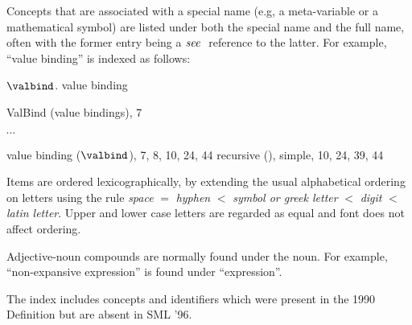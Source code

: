 \begin{theindex}
Concepts
 that are associated with a
special name (e.g, a meta-variable or a mathematical symbol)
are listed under both the special name and the full name,
often with the former entry being a ${\it see\ }$ reference to the latter.
For example, ``value binding'' is indexed as follows:
\indexspace

\item $\valbind$. \see value binding
\item ValBind (value bindings), 7
\item $\cdots$
\item value binding ($\valbind$), 7, 8, 10, 24, 44
\subitem recursive (), \recrefs
\subitem simple, 10, 24, 39, 44
\indexspace

Items are ordered lexicographically, by extending the
usual alphabetical ordering on letters using the rule
{\it space} $=$ {\it hyphen} $<$ {\it symbol or greek letter}  $<$ {\it digit} $<$ {\it latin letter}.
Upper and lower case letters are regarded as equal and font does not affect
ordering.

Adjective-noun compounds are normally found under the noun. For example,
``non-expansive expression'' is found under ``expression''.

The index includes concepts and identifiers
which were present in the 1990 Definition but are absent in SML '96.

\indexspace


\end{theindex}
